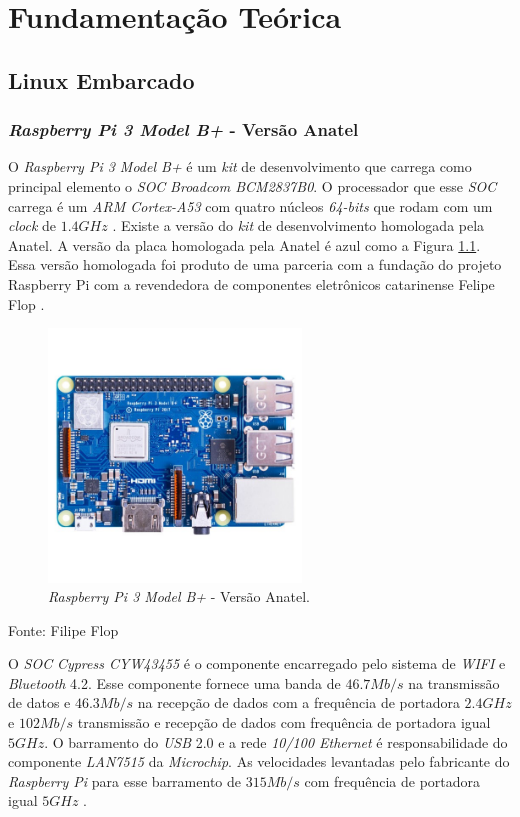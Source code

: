 \chapter{Fundamentação Teórica}

\section{Linux Embarcado}

\subsection{\textit{Raspberry Pi 3 Model B+} - Versão Anatel}

O \textit{Raspberry Pi 3 Model B+} é um \textit{kit} de desenvolvimento que carrega como principal elemento o \textit{SOC} \textit{Broadcom BCM2837B0}.
O processador que esse \textit{SOC} carrega é um \textit{ARM Cortex-A53} com quatro núcleos \textit{64-bits} que rodam com um \textit{clock} de $1.4 GHz$ \cite{rasp3bplus2019}. 
Existe a versão do \textit{kit} de desenvolvimento homologada pela Anatel. A versão da placa homologada pela Anatel é azul como a Figura \ref{fig:rasp_anatel}. Essa versão homologada foi produto de uma parceria com a fundação do projeto Raspberry Pi com a revendedora de componentes eletrônicos catarinense Felipe Flop \cite{raspanatel2019}.

\begin{figure}[!htb]
    \centering
    \caption{\textit{Raspberry Pi 3 Model B+} - Versão Anatel.}
    \label{fig:rasp_anatel}
    \includegraphics[width=0.6\textwidth]{./img/fundamentacao/rasp_anatel.jpg}
\end{figure}
Fonte: Filipe Flop

O \textit{SOC} \textit{Cypress CYW43455} é o componente encarregado pelo sistema de \textit{WIFI} e \textit{Bluetooth} 4.2. 
Esse componente fornece uma banda de $46.7Mb/s$ na transmissão de datos e $46.3Mb/s$ na recepção de dados com a frequência de portadora $2.4GHz$ e $102Mb/s$ transmissão e recepção de dados com frequência de portadora igual $5GHz$. 
O barramento do \textit{USB} 2.0 e a rede \textit{10/100 Ethernet} é responsabilidade do componente \textit{LAN7515} da \textit{Microchip}. As velocidades levantadas pelo fabricante do \textit{Raspberry Pi} para esse barramento de $315Mb/s$  com frequência de portadora igual $5GHz$ \cite{rasp3bplus2019}.
 
